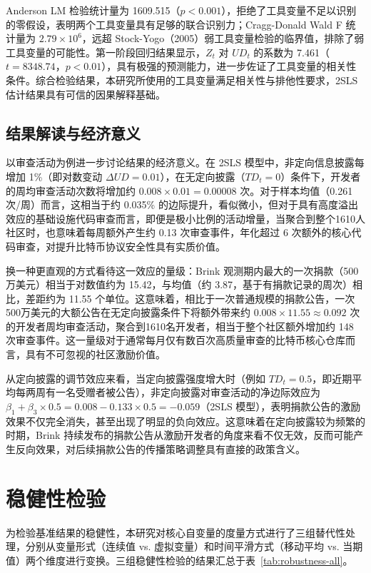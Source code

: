 \documentclass[
    type = master, %
    degree = professional,        %
    decl-page,  %
    twoside,                %
    fontset = fandol %
  ]{njuthesis}
\begin{document}
Anderson LM 检验统计量为 1609.515（$p < 0.001$），拒绝了工具变量不足以识别的零假设，表明两个工具变量具有足够的联合识别力；Cragg-Donald Wald F 统计量为 $2.79 \times 10^6$，远超 Stock-Yogo（2005）\cite{stock2005testing}弱工具变量检验的临界值，排除了弱工具变量的可能性。第一阶段回归结果显示，$Z_t$ 对 $\mathit{UD}_t$ 的系数为 7.461（$t = 8348.74$，$p < 0.01$），具有极强的预测能力，进一步佐证了工具变量的相关性条件。综合检验结果，本研究所使用的工具变量满足相关性与排他性要求，2SLS 估计结果具有可信的因果解释基础。

\subsection{结果解读与经济意义}

以审查活动为例进一步讨论结果的经济意义。在 2SLS 模型中，非定向信息披露每增加 1\%（即对数变动 $\Delta UD = 0.01$），在无定向披露（$TD_t = 0$）条件下，开发者的周均审查活动次数将增加约 $0.008 \times 0.01 = 0.00008$ 次。对于样本均值（0.261 次/周）而言，这相当于约 0.035\% 的边际提升，看似微小，但对于具有高度溢出效应的基础设施代码审查而言，即便是极小比例的活动增量，当聚合到整个1610人社区时，也意味着每周额外产生约 0.13 次审查事件，年化超过 6 次额外的核心代码审查，对提升比特币协议安全性具有实质价值。

换一种更直观的方式看待这一效应的量级：Brink 观测期内最大的一次捐款（500万美元）相当于对数值约为 15.42，与均值（约 3.87，基于有捐款记录的周次）相比，差距约为 11.55 个单位。这意味着，相比于一次普通规模的捐款公告，一次500万美元的大额公告在无定向披露条件下将额外带来约 $0.008 \times 11.55 \approx 0.092$ 次的开发者周均审查活动，聚合到1610名开发者，相当于整个社区额外增加约 148 次审查事件。这一量级对于通常每月仅有数百次高质量审查的比特币核心仓库而言，具有不可忽视的社区激励价值。

从定向披露的调节效应来看，当定向披露强度增大时（例如 $TD_t = 0.5$，即近期平均每两周有一名受赠者被公告），非定向披露对审查活动的净边际效应为 $\beta_1 + \beta_3 \times 0.5 = 0.008 - 0.133 \times 0.5 = -0.059$（2SLS 模型），表明捐款公告的激励效果不仅完全消失，甚至出现了明显的负向效应。这意味着在定向披露较为频繁的时期，Brink 持续发布的捐款公告从激励开发者的角度来看不仅无效，反而可能产生反向效果，对后续捐款公告的传播策略调整具有直接的政策含义。

\section{稳健性检验}
\label{sec:robust-1}

为检验基准结果的稳健性，本研究对核心自变量的度量方式进行了三组替代性处理，分别从变量形式（连续值 vs. 虚拟变量）和时间平滑方式（移动平均 vs. 当期值）两个维度进行变换。三组稳健性检验的结果汇总于表~\ref{tab:robustness-all}。
\end{document}
